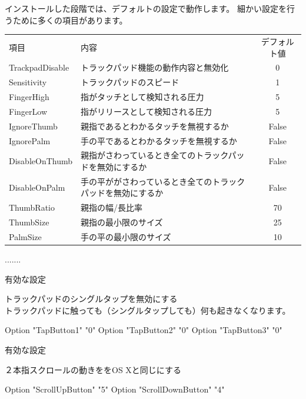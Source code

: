 \begin{frame}[containsverbatim]
インストールした段階では、デフォルトの設定で動作します。
細かい設定を行うために多くの項目があります。
\begin{table}[htb]
  \begin{tabular}{llc}
    項目 & 内容 & デフォルト値 \\
    TrackpadDisable & トラックパッド機能の動作内容と無効化 & 0 \\
    Sensitivity & トラックパッドのスピード & 1 \\
    FingerHigh & 指がタッチとして検知される圧力 & 5 \\
    FingerLow & 指がリリースとして検知される圧力 & 5 \\
    IgnoreThumb & 親指であるとわかるタッチを無視するか & False \\
    IgnorePalm & 手の平であるとわかるタッチを無視するか & False \\
    DisableOnThumb & 親指がさわっているとき全てのトラックパッドを無効にするか & False \\
    DisableOnPalm & 手の平ががさわっているとき全てのトラックパッドを無効にするか & False \\
    ThumbRatio & 親指の幅/長比率 & 70 \\
    ThumbSize & 親指の最小限のサイズ & 25 \\
    PalmSize & 手の平の最小限のサイズ & 10 \\
  \end{tabular}
\end{table}
.......

\end{frame}

\begin{frame}[containsverbatim]{有効な設定}

トラックパッドのシングルタップを無効にする\\
トラックパッドに触っても（シングルタップしても）何も起きなくなります。

\begin{commandline}
Option "TapButton1" "0"
Option "TapButton2" "0"
Option "TapButton3" "0"
\end{commandline}

\end{frame}

\begin{frame}[containsverbatim]{有効な設定}

２本指スクロールの動きををOS Xと同じにする
\begin{commandline}
Option "ScrollUpButton" "5"
Option "ScrollDownButton" "4"
\end{commandline}

\end{frame}

